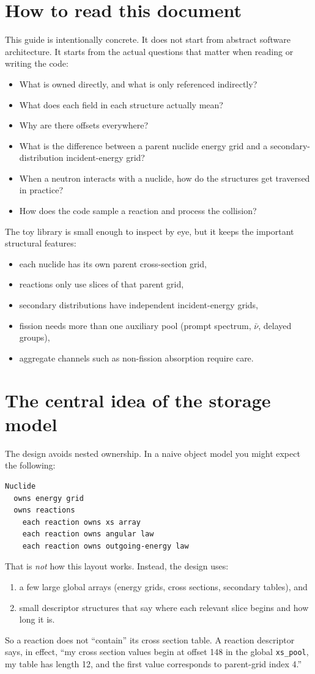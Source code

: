 \documentclass[11pt,a4paper]{article}
\begin{document}
\section{How to read this document}
This guide is intentionally concrete. It does not start from abstract software architecture. It starts from the actual questions that matter when reading or writing the code:
\begin{itemize}[leftmargin=1.4em]
  \item What is owned directly, and what is only referenced indirectly?
  \item What does each field in each structure actually mean?
  \item Why are there offsets everywhere?
  \item What is the difference between a parent nuclide energy grid and a secondary-distribution incident-energy grid?
  \item When a neutron interacts with a nuclide, how do the structures get traversed in practice?
  \item How does the code sample a reaction and process the collision?
\end{itemize}
The toy library is small enough to inspect by eye, but it keeps the important structural features:
\begin{itemize}[leftmargin=1.4em]
  \item each nuclide has its own parent cross-section grid,
  \item reactions only use slices of that parent grid,
  \item secondary distributions have independent incident-energy grids,
  \item fission needs more than one auxiliary pool (prompt spectrum, $\bar\nu$, delayed groups),
  \item aggregate channels such as non-fission absorption require care.
\end{itemize}

\section{The central idea of the storage model}
The design avoids nested ownership. In a naive object model you might expect the following:
\begin{lstlisting}
Nuclide
  owns energy grid
  owns reactions
    each reaction owns xs array
    each reaction owns angular law
    each reaction owns outgoing-energy law
\end{lstlisting}
That is \emph{not} how this layout works. Instead, the design uses:
\begin{enumerate}[leftmargin=1.4em]
  \item a few large global arrays (energy grids, cross sections, secondary tables), and
  \item small descriptor structures that say where each relevant slice begins and how long it is.
\end{enumerate}
So a reaction does not ``contain'' its cross section table. A reaction descriptor says, in effect, ``my cross section values begin at offset 148 in the global \texttt{xs\_pool}, my table has length 12, and the first value corresponds to parent-grid index 4.''
\end{document}
